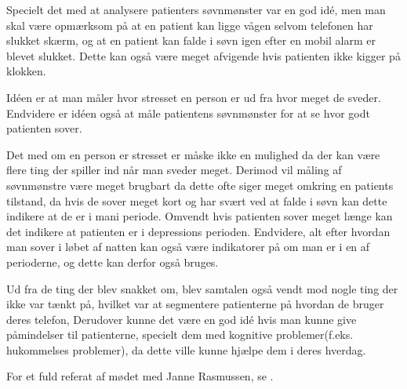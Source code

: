 \begin{description}[style=nextline]
	Specielt det med at analysere patienters søvnmønster var en god idé, men man skal være opmærksom på at en patient kan ligge vågen selvom telefonen har slukket skærm, og at en patient kan falde i søvn igen efter en mobil alarm er blevet slukket.
	Dette kan også være meget afvigende hvis patienten ikke kigger på klokken.
\item[Galvanisk hud respons]
	Idéen er at man måler hvor stresset en person er ud fra hvor meget de sveder. 
	Endvidere er idéen også at måle patientens søvnmønster for at se hvor godt patienten sover.
	
	Det med om en person er stresset er måske ikke en mulighed da der kan være flere ting der spiller ind når man sveder meget.
	Derimod vil måling af søvnmønstre være meget brugbart da dette ofte siger meget omkring en patients tilstand, da hvis de sover meget kort og har svært ved at falde i søvn kan dette indikere at de er i mani periode.
	Omvendt hvis patienten sover meget længe kan det indikere at patienten er i depressions perioden.
	Endvidere, alt efter hvordan man sover i løbet af natten kan også være indikatorer på om man er i en af perioderne, og dette kan derfor også bruges. 
\item[Andre]
	Ud fra de ting der blev snakket om, blev samtalen også vendt mod nogle ting der ikke var tænkt på, hvilket var at segmentere patienterne på hvordan de bruger deres telefon, 
	Derudover kunne det være en god idé hvis man kunne give påmindelser til patienterne, specielt dem med kognitive problemer(f.eks. hukommelses problemer), da dette ville kunne hjælpe dem i deres hverdag.
\end{description}

For et fuld referat af mødet med Janne Rasmussen, se .